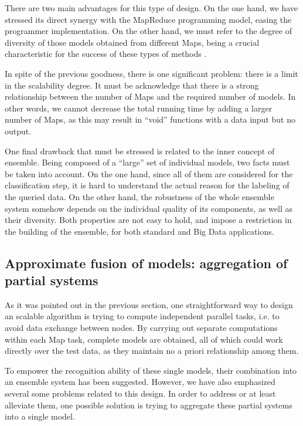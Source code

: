 \documentclass[3p,review]{elsarticle}
\begin{document}
There are two main advantages for this type of design. On the one hand, we have stressed its direct synergy with the MapReduce programming model, easing the programmer implementation. On the other hand, we must refer to the degree of diversity of those models obtained from different Maps, being a crucial characteristic for the success of these types of methods \cite{Kuncheva05}. 

In spite of the previous goodness, there is one significant problem: there is a limit in the scalability degree. It must be acknowledge that there is a strong relationship between the number of Maps and the required number of models. In other words, we cannot decrease the total running time by adding a larger number of Maps, as this may result in ``void'' functions with a data input but no output. 

One final drawback that must be stressed is related to the inner concept of ensemble. Being composed of a ``large'' set of individual models, two facts must be taken into account. On the one hand, since all of them are considered for the classification step, it is hard to understand the actual reason for the labeling of the queried data. On the other hand, the robustness of the whole ensemble system somehow depends on the individual quality of its components, as well as their diversity. Both properties are not easy to hold, and impose a restriction in the building of the ensemble, for both standard and Big Data applications.

\subsection{Approximate fusion of models: aggregation of partial systems}\label{subsec:submodels}

As it was pointed out in the previous section, one straightforward way to design an scalable algorithm is trying to compute independent parallel tasks, i.e. to avoid data exchange between nodes. By carrying out separate computations within each Map task, complete models are obtained, all of which could work directly over the test data, as they maintain no a priori relationship among them. %

To empower the recognition ability of these single models, their combination into an ensemble system has been suggested. However, we have also emphasized several some problems related to this design. In order to address or at least alleviate them, one possible solution is trying to aggregate these partial systems into a single model. 
\end{document}
